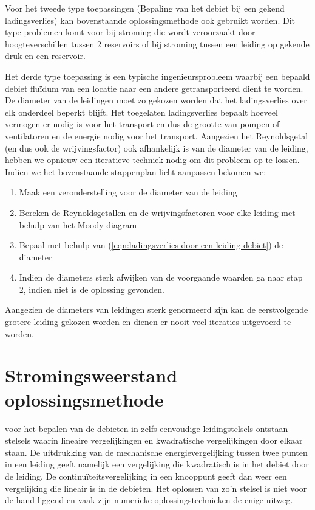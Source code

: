 Voor het tweede type toepassingen (Bepaling van het debiet bij een gekend ladingsverlies) kan bovenstaande oplossingsmethode ook gebruikt worden. Dit type problemen komt voor bij stroming die wordt veroorzaakt door hoogteverschillen tussen 2 reservoirs of bij stroming tussen een leiding op gekende druk en een reservoir. 

Het derde type toepassing is een typische ingenieursprobleem waarbij een bepaald debiet fluïdum van een locatie naar een andere getransporteerd dient te worden. De diameter van de leidingen moet zo gekozen worden dat het ladingsverlies over elk onderdeel beperkt blijft. Het toegelaten ladingsverlies bepaalt hoeveel vermogen er nodig is voor het transport en dus de grootte van pompen of ventilatoren en de energie nodig voor het transport. Aangezien het Reynoldsgetal (en dus ook de wrijvingsfactor) ook afhankelijk is van de diameter van de leiding, hebben we opnieuw een iteratieve techniek nodig om dit probleem op te lossen. Indien we het bovenstaande stappenplan licht aanpassen bekomen we:
\begin{enumerate}
	\item Maak een veronderstelling voor de diameter van de leiding
	\item Bereken de Reynoldsgetallen en de wrijvingsfactoren voor elke leiding met behulp van het Moody diagram
	\item Bepaal met behulp van (\ref{eqn:ladingsverlies door een leiding debiet}) de diameter
	\item Indien de diameters sterk afwijken van de voorgaande waarden ga naar stap 2, indien niet is de oplossing gevonden.
\end{enumerate}
Aangezien de diameters van leidingen sterk genormeerd zijn kan de eerstvolgende grotere leiding gekozen worden en dienen er nooit veel iteraties uitgevoerd te worden.


	\section{Stromingsweerstand oplossingsmethode}
	\label{sec:stromingsweerstand oplossingsmethode}
voor het bepalen van de debieten in zelfs eenvoudige leidingstelsels ontstaan stelsels waarin lineaire vergelijkingen en kwadratische vergelijkingen door elkaar staan. De uitdrukking van de mechanische energievergelijking tussen twee punten in een leiding geeft namelijk een vergelijking die kwadratisch is in het debiet door de leiding. De continuïteitsvergelijking in een knooppunt geeft dan weer een vergelijking die lineair is in de debieten. Het oplossen van zo'n stelsel is niet voor de hand liggend en vaak zijn numerieke oplossingstechnieken de enige uitweg.

